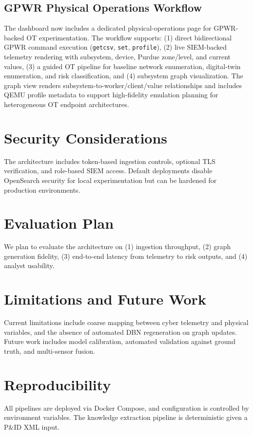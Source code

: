 \documentclass[journal]{IEEEtran}
\begin{document}
\subsection{GPWR Physical Operations Workflow}
The dashboard now includes a dedicated physical-operations page for GPWR-backed OT
experimentation. The workflow supports: (1) direct bidirectional GPWR command execution
(\texttt{getcsv}, \texttt{set}, \texttt{profile}), (2) live SIEM-backed telemetry rendering
with subsystem, device, Purdue zone/level, and current values, (3) a guided OT pipeline
for baseline network enumeration, digital-twin enumeration, and risk classification, and
(4) subsystem graph visualization. The graph view renders subsystem-to-worker/client/value
relationships and includes QEMU profile metadata to support high-fidelity emulation planning
for heterogeneous OT endpoint architectures.

\section{Security Considerations}
The architecture includes token-based ingestion controls, optional TLS verification,
and role-based SIEM access. Default deployments disable OpenSearch security for local
experimentation but can be hardened for production environments.

\section{Evaluation Plan}
We plan to evaluate the architecture on (1) ingestion throughput, (2) graph generation
fidelity, (3) end-to-end latency from telemetry to risk outputs, and (4) analyst usability.

\section{Limitations and Future Work}
Current limitations include coarse mapping between cyber telemetry and physical variables,
and the absence of automated DBN regeneration on graph updates. Future work includes
model calibration, automated validation against ground truth, and multi-sensor fusion.

\section{Reproducibility}
All pipelines are deployed via Docker Compose, and configuration is controlled by
environment variables. The knowledge extraction pipeline is deterministic given a
P\&ID XML input.
\end{document}
